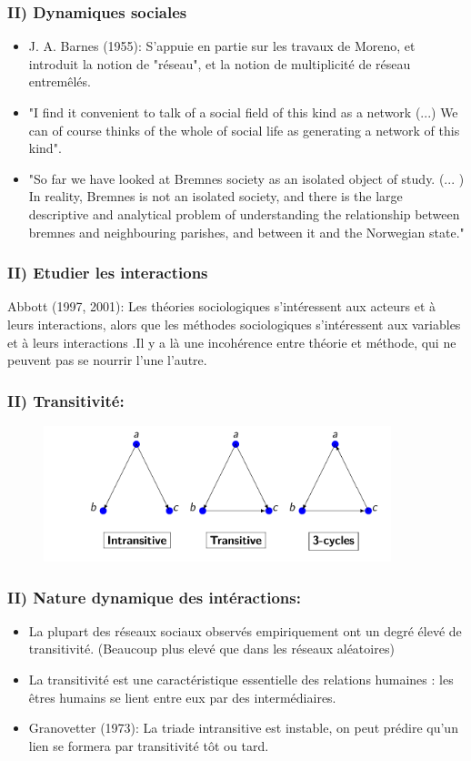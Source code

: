 \documentclass{beamer}
\begin{document}
\begin{frame}
    \frametitle{II) Dynamiques sociales}
    \begin{itemize}
        \item J. A. Barnes (1955): S'appuie en partie sur les travaux de Moreno, et introduit la notion de "réseau", et la notion de multiplicité de réseau entremêlés. 
        \item "I find it convenient to talk of a social field of this kind as a network (...) We can of course thinks of the whole of social life as generating a network of this kind".
        \item "So far we have looked at Bremnes society as an isolated object of study. (... ) In reality, Bremnes is not an isolated society, and there is the large descriptive and analytical problem of understanding the relationship between bremnes and neighbouring parishes, and between it and the Norwegian state."
    \end{itemize}
\end{frame}

\begin{frame}
    \frametitle{II) Etudier les interactions}
    Abbott (1997, 2001): Les théories sociologiques s’intéressent aux
    acteurs et à leurs interactions, alors que les méthodes sociologiques s’intéressent aux variables et à leurs interactions .Il y a là une incohérence entre théorie et méthode, qui ne peuvent pas se nourrir l’une l’autre.
\end{frame}

\begin{frame}
    \frametitle{II) Transitivité:}
    \begin{figure}
        \centering
        \includegraphics[width = 0.9\textwidth]{triades_transitivite.png}
      \end{figure}
\end{frame}

\begin{frame}
    \frametitle{II) Nature dynamique des intéractions:}
    \begin{itemize}
        \item La plupart des réseaux sociaux observés empiriquement ont un degré élevé de transitivité. (Beaucoup plus elevé que dans les réseaux aléatoires)
        \item La transitivité est une caractéristique essentielle des relations humaines : les êtres humains se lient entre eux par des intermédiaires.
        \item Granovetter (1973): La triade intransitive est instable, on peut prédire qu’un lien se formera par transitivité tôt ou tard.
    \end{itemize}
\end{frame}
\end{document}
